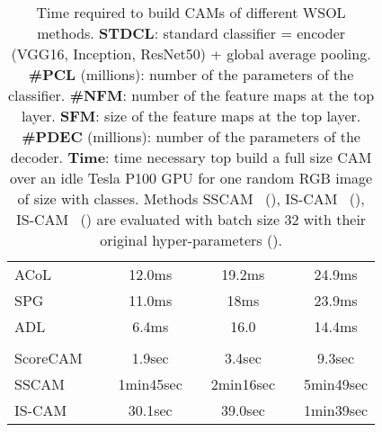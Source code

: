 \documentclass[twocolumn]{article}
\theoremstyle{definition}
\begin{document}
{\begin{table*}[ht!]
{\begin{tabular}{lc*{4}{c}c*{4}{c}c*{4}{c}}
ACoL~\cite{ZhangWF0H18}  &  &                   \multicolumn{4}{c}{12.0ms}  && \multicolumn{4}{c}{19.2ms}  && \multicolumn{4}{c}{24.9ms} \\
SPG~\cite{ZhangWKYH18}  &  &                   \multicolumn{4}{c}{11.0ms}  && \multicolumn{4}{c}{18ms}  && \multicolumn{4}{c}{23.9ms} \\
ADL~\cite{ChoeS19}  &  &                   \multicolumn{4}{c}{6.4ms}  && \multicolumn{4}{c}{16.0}  && \multicolumn{4}{c}{14.4ms} \\
\cline{1-1}\cline{3-6}\cline{8-11}\cline{13-16} \\
ScoreCAM~\cite{WangWDYZDMH20scorecam}  &  &         \multicolumn{4}{c}{1.9sec}  && \multicolumn{4}{c}{3.4sec}  && \multicolumn{4}{c}{9.3sec} \\
SSCAM~\cite{naidu2020sscam}  &&\multicolumn{4}{c}{1min45sec} && \multicolumn{4}{c}{2min16sec}  &&\multicolumn{4}{c}{5min49sec} \\
IS-CAM~\cite{naidu2020iscam}  &  &  \multicolumn{4}{c}{30.1sec}  && \multicolumn{4}{c}{39.0sec}  && \multicolumn{4}{c}{1min39sec} \\
\end{tabular}
}
\caption{
Time required to build CAMs of different WSOL methods.
\textbf{STDCL}: standard classifier = encoder (VGG16, Inception, ResNet50) + global average pooling.
\textbf{\#PCL} (millions): number of the parameters of the classifier.
\textbf{\#NFM}: number of the feature maps at the top layer.
\textbf{SFM}: size of the feature maps at the top layer.
\textbf{\#PDEC} (millions): number of the parameters of the decoder.
\textbf{Time}: time necessary top build a full size CAM over an idle Tesla P100 GPU for one random RGB image of size  with  classes.
Methods SSCAM~\cite{naidu2020sscam} (), IS-CAM~\cite{naidu2020iscam} (), IS-CAM~\cite{naidu2020iscam} () are evaluated with batch size 32 with their original hyper-parameters ().
}
\label{tab:complexity}
\vspace{-1em}
\end{table*}
}
\end{document}
